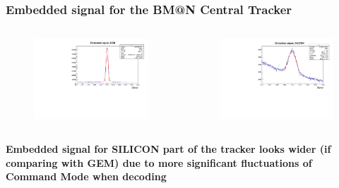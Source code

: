 \documentclass[dvipsnames] {beamer}
\begin{document}
      \begin{frame}
        \frametitle{\bf \centering Embedded signal for the BM@N Central Tracker}
        \begin{columns}[t]
          \begin{figure}[H]
           \includegraphics[width=1.\linewidth]{EmbeddedGemSignal.pdf}
          \end{figure}
          \begin{figure}[H]
           \includegraphics[width=1.\linewidth]{EmbeddedSiliconSignal.pdf}
          \end{figure}
        \end{columns}
        \begin{block}{}
          \bf
          Embedded signal for SILICON part of the tracker looks wider (if comparing with GEM) due to more significant fluctuations of
          Command Mode when decoding
        \end{block}
        
      \end{frame}
       
\end{document}
